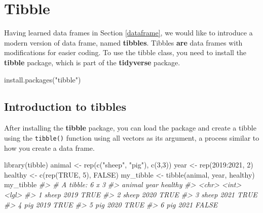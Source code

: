 \documentclass[
]{book}
\newenvironment{Shaded}{\begin{snugshade}}{\end{snugshade}}
\newcommand{\CommentTok}[1]{\textcolor[rgb]{0.56,0.35,0.01}{\textit{#1}}}
\newcommand{\ConstantTok}[1]{\textcolor[rgb]{0.00,0.00,0.00}{#1}}
\newcommand{\DecValTok}[1]{\textcolor[rgb]{0.00,0.00,0.81}{#1}}
\newcommand{\FunctionTok}[1]{\textcolor[rgb]{0.00,0.00,0.00}{#1}}
\newcommand{\NormalTok}[1]{#1}
\newcommand{\OtherTok}[1]{\textcolor[rgb]{0.56,0.35,0.01}{#1}}
\newcommand{\SpecialCharTok}[1]{\textcolor[rgb]{0.00,0.00,0.00}{#1}}
\newcommand{\StringTok}[1]{\textcolor[rgb]{0.31,0.60,0.02}{#1}}
\begin{document}
\hypertarget{tibble}{%
\section{Tibble}\label{tibble}}

Having learned data frames in Section \ref{dataframe}, we would like to introduce a modern version of data frame, named \textbf{tibbles}. Tibbles \textbf{are} data frames with modifications for easier coding. To use the tibble class, you need to install the \textbf{tibble} package, which is part of the \textbf{tidyverse} package.

\begin{Shaded}
\begin{Highlighting}[]
\FunctionTok{install.packages}\NormalTok{(}\StringTok{"tibble"}\NormalTok{)}
\end{Highlighting}
\end{Shaded}

\hypertarget{introduction-to-tibbles}{%
\subsection{Introduction to tibbles}\label{introduction-to-tibbles}}

After installing the \textbf{tibble} package, you can load the package and create a tibble using the \texttt{tibble()} function using all vectors as its argument, a process similar to how you create a data frame.

\begin{Shaded}
\begin{Highlighting}[]
\FunctionTok{library}\NormalTok{(tibble)}
\NormalTok{animal }\OtherTok{\textless{}{-}} \FunctionTok{rep}\NormalTok{(}\FunctionTok{c}\NormalTok{(}\StringTok{"sheep"}\NormalTok{, }\StringTok{"pig"}\NormalTok{), }\FunctionTok{c}\NormalTok{(}\DecValTok{3}\NormalTok{,}\DecValTok{3}\NormalTok{))}
\NormalTok{year }\OtherTok{\textless{}{-}} \FunctionTok{rep}\NormalTok{(}\DecValTok{2019}\SpecialCharTok{:}\DecValTok{2021}\NormalTok{, }\DecValTok{2}\NormalTok{)}
\NormalTok{healthy }\OtherTok{\textless{}{-}} \FunctionTok{c}\NormalTok{(}\FunctionTok{rep}\NormalTok{(}\ConstantTok{TRUE}\NormalTok{, }\DecValTok{5}\NormalTok{), }\ConstantTok{FALSE}\NormalTok{)}
\NormalTok{my\_tibble }\OtherTok{\textless{}{-}} \FunctionTok{tibble}\NormalTok{(animal, year, healthy)}
\NormalTok{my\_tibble}
\CommentTok{\#\textgreater{} \# A tibble: 6 x 3}
\CommentTok{\#\textgreater{}   animal  year healthy}
\CommentTok{\#\textgreater{}   \textless{}chr\textgreater{}  \textless{}int\textgreater{} \textless{}lgl\textgreater{}  }
\CommentTok{\#\textgreater{} 1 sheep   2019 TRUE   }
\CommentTok{\#\textgreater{} 2 sheep   2020 TRUE   }
\CommentTok{\#\textgreater{} 3 sheep   2021 TRUE   }
\CommentTok{\#\textgreater{} 4 pig     2019 TRUE   }
\CommentTok{\#\textgreater{} 5 pig     2020 TRUE   }
\CommentTok{\#\textgreater{} 6 pig     2021 FALSE}
\end{Highlighting}
\end{Shaded}
\end{document}
